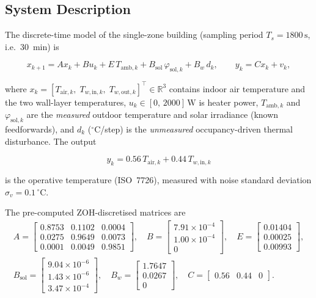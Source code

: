 \subsection{System Description}
\label{subsec:system}

The discrete-time model of the single-zone building (sampling period
$T_s = 1800\,\mathrm{s}$, i.e.\ 30~min) is

\begin{equation*}
	x_{k+1} = A x_k + B u_k + E\,T_{\mathrm{amb},k}
	+ B_{\mathrm{sol}}\,\varphi_{\mathrm{sol},k}
	+ B_w\,d_k,
	\qquad
	y_k = C x_k + v_k,
\end{equation*}

\noindent where
$x_k = [T_{\mathrm{air},k},\; T_{w,\mathrm{in},k},\; T_{w,\mathrm{out},k}]^\top
\in \mathbb{R}^3$
contains indoor air temperature and the two wall-layer temperatures,
$u_k \in [0,\,2000]\,\mathrm{W}$ is heater power,
$T_{\mathrm{amb},k}$ and $\varphi_{\mathrm{sol},k}$ are the
\emph{measured} outdoor temperature and solar irradiance (known
feedforwards), and $d_k$ (${}^\circ$C/step) is the
\emph{unmeasured} occupancy-driven thermal disturbance.  The output

\[
y_k = 0.56\,T_{\mathrm{air},k} + 0.44\,T_{w,\mathrm{in},k}
\]

is the operative temperature (ISO~7726), measured with noise standard
deviation $\sigma_v = 0.1\,{}^\circ$C.

The pre-computed ZOH-discretised matrices are
\begin{multline*}
	A = \begin{bmatrix}
		0.8753 & 0.1102 & 0.0004 \\
		0.0275 & 0.9649 & 0.0073 \\
		0.0001 & 0.0049 & 0.9851
	\end{bmatrix}, \quad
	B = \begin{bmatrix}7.91\times10^{-4}\\1.00\times10^{-4}\\0\end{bmatrix},\quad
	E  = \begin{bmatrix}0.01404\\0.00025\\0.00993\end{bmatrix},\\[4pt]
	B_{\mathrm{sol}} = \begin{bmatrix}9.04\times10^{-6}\\1.43\times10^{-6}\\3.47\times10^{-4}\end{bmatrix}, \quad
	B_w = \begin{bmatrix}1.7647\\0.0267\\0\end{bmatrix},\quad
	C  = \begin{bmatrix}0.56 & 0.44 & 0\end{bmatrix}.
\end{multline*}

